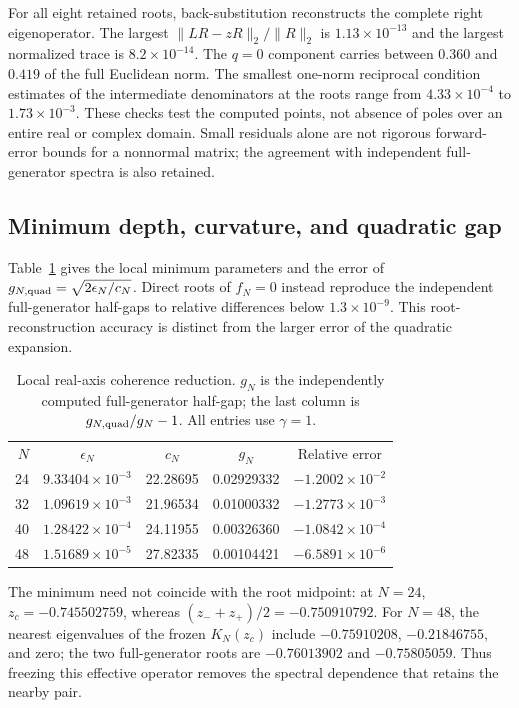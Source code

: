 \documentclass[aps,pra,10pt,onecolumn,superscriptaddress,amsmath,amssymb]{revtex4-2}
\begin{document}
For all eight retained roots, back-substitution reconstructs the complete right eigenoperator. The largest $\|LR-zR\|_2/\|R\|_2$ is $1.13\times10^{-13}$ and the largest normalized trace is $8.2\times10^{-14}$. The $q=0$ component carries between $0.360$ and $0.419$ of the full Euclidean norm. The smallest one-norm reciprocal condition estimates of the intermediate denominators at the roots range from $4.33\times10^{-4}$ to $1.73\times10^{-3}$. These checks test the computed points, not absence of poles over an entire real or complex domain. Small residuals alone are not rigorous forward-error bounds for a nonnormal matrix; the agreement with independent full-generator spectra is also retained.

\subsection{Minimum depth, curvature, and quadratic gap}
Table~\ref{tab:cf} gives the local minimum parameters and the error of $g_{N,\rm quad}=\sqrt{2\epsilon_N/c_N}$. Direct roots of $f_N=0$ instead reproduce the independent full-generator half-gaps to relative differences below $1.3\times10^{-9}$. This root-reconstruction accuracy is distinct from the larger error of the quadratic expansion.

\begin{table}[ht]
\caption{Local real-axis coherence reduction. $g_N$ is the independently computed full-generator half-gap; the last column is $g_{N,\rm quad}/g_N-1$. All entries use $\gamma=1$.}
\label{tab:cf}
\begin{ruledtabular}
\begin{tabular}{rcccc}
$N$&$\epsilon_N$&$c_N$&$g_N$&Relative error\\
24&$9.33404\times10^{-3}$&22.28695&0.02929332&$-1.2002\times10^{-2}$\\
32&$1.09619\times10^{-3}$&21.96534&0.01000332&$-1.2773\times10^{-3}$\\
40&$1.28422\times10^{-4}$&24.11955&0.00326360&$-1.0842\times10^{-4}$\\
48&$1.51689\times10^{-5}$&27.82335&0.00104421&$-6.5891\times10^{-6}$
\end{tabular}
\end{ruledtabular}
\end{table}

The minimum need not coincide with the root midpoint: at $N=24$, $z_c=-0.745502759$, whereas $(z_-+z_+)/2=-0.750910792$. For $N=48$, the nearest eigenvalues of the frozen $K_N(z_c)$ include $-0.75910208$, $-0.21846755$, and zero; the two full-generator roots are $-0.76013902$ and $-0.75805059$. Thus freezing this effective operator removes the spectral dependence that retains the nearby pair.
\end{document}
